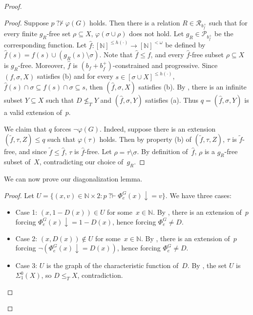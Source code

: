 \documentclass[10pt,a4paper]{article}
\def\P{\mathcal{P}}
\newcommand{\qvdash}{\operatorname{{?}{\vdash}}}
\newcommand{\nqvdash}{\operatorname{{?}{\nvdash}}}
\newcommand{\NN}[0]{\mathbb{N}}
\numberwithin{theorem}{section}
\newtheorem{lemma}[theorem]{Lemma}
\newcommand{\R}{\mathcal{R}}
\begin{document}
\begin{proof}
\begin{proof}
Suppose $p \nqvdash \varphi(G)$ holds. Then there is a relation $R \in \R_{b_f^{+}}$ such that for every finite $g_R$-free set $\rho \subseteq X$, $\varphi(\sigma \cup \rho)$ does not hold. Let $g_R \in \P_{b_f^{+}}$ be the corresponding function. Let $\hat{f} : [\NN]^{\leq h(\cdot)} \to [\NN]^{<\omega}$ be defined by $\hat{f}(s) = f(s) \cup (g_R(s) \setminus \sigma)$. Note that $\hat{f} \leq f$, and every $\hat{f}$-free subset $\rho \subseteq X$ is $g_R$-free. Moreover, $\hat{f}$ is $(b_f + b_f^{+})$-constrained and progressive. Since $(f, \sigma, X)$ satisfies (b) and for every $s \in [\sigma \cup X]^{\leq h(\cdot)}$, $\hat{f}(s)\cap \sigma\subseteq f(s)\cap \sigma\subseteq s$, then $(\hat{f}, \sigma, X)$ satisfies (b). By , there is an infinite subset $Y \subseteq X$ such that $D \not \leq_T Y$ and $(\hat{f}, \sigma, Y)$ satisfies (a). Thus $q = (\hat{f}, \sigma, Y)$ is a valid extension of~$p$. 

We claim that $q$ forces $\neg \varphi(G)$. Indeed, suppose there is an extension $(\tilde{f}, \tau, Z) \leq q$ such that $\varphi(\tau)$ holds. Then by property (b) of  $(\tilde{f}, \tau, Z)$, $\tau$ is $\tilde{f}$-free, and since $\tilde{f} \leq \hat{f}$, $\tau$ is $\hat{f}$-free. Let $\rho = \tau \setminus \sigma$. By definition of~$\hat{f}$, $\rho$ is a $g_R$-free subset of~$X$, contradicting our choice of~$g_R$.
\end{proof}

We can now prove our diagonalization lemma.

\begin{proof}
Let $U = \{ (x, v) \in \NN \times 2 : p \qvdash \Phi^G_e(x) \downarrow = v \}$. We have three cases:
\begin{itemize}
    \item Case 1: $(x, 1-D(x)) \in U$ for some~$x \in \NN$. By , there is an extension of~$p$ forcing $\Phi^G_e(x)\downarrow = 1-D(x)$, hence forcing $\Phi_e^G \neq D$.
    \item Case 2: $(x, D(x)) \not \in U$ for some~$x \in \NN$. By , there is an extension of~$p$ forcing $\neg (\Phi^G_e(x)\downarrow = D(x))$, hence forcing $\Phi_e^G \neq D$.
    \item Case 3: $U$ is the graph of the characteristic function of~$D$. By , the set $U$ is $\Sigma^0_1(X)$, so $D \leq_T X$, contradiction.
\end{itemize}
\end{proof}


\end{proof}
\end{document}
